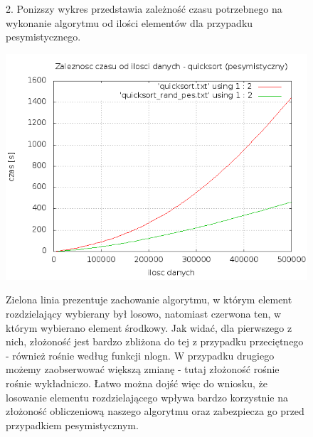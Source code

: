 \documentclass[a4paper,11pt]{report}
\begin{document}
\begin{figure}
  2. Ponizszy wykres przedstawia zależność czasu potrzebnego na wykonanie algorytmu od ilości elementów dla przypadku pesymistycznego.
    \begin{center}\includegraphics[scale=0.55]{./quicksort_pes.png}\end{center}
    Zielona linia prezentuje zachowanie algorytmu, w którym element rozdzielający wybierany był losowo, natomiast czerwona ten, w którym wybierano element środkowy. Jak widać, dla pierwszego z nich, złożoność jest bardzo zbliżona do tej z przypadku przeciętnego - również rośnie według funkcji nlogn. W przypadku drugiego możemy zaobserwować większą zmianę - tutaj złożoność rośnie rośnie wykładniczo. Łatwo można dojść więc do wniosku, że losowanie elementu rozdzielającego wpływa bardzo korzystnie na złożoność obliczeniową naszego algorytmu oraz zabezpiecza go przed przypadkiem pesymistycznym.
    \end{figure}
\end{document}
